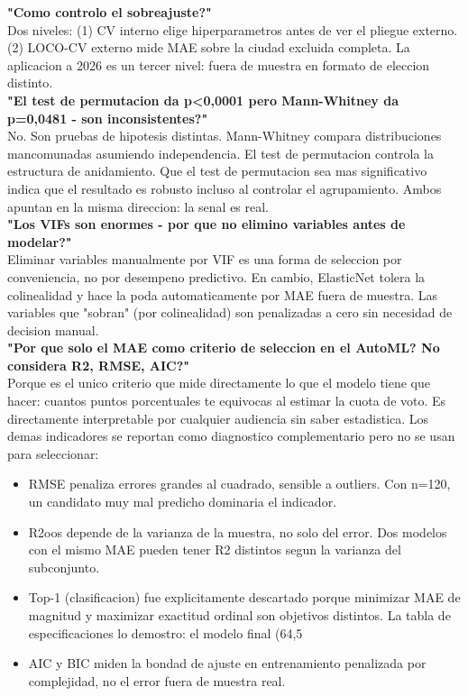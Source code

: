 \documentclass[11pt,a4paper]{article}
\begin{document}
{{{\textbf{"Como controlo el sobreajuste?"}\\[2pt]
Dos niveles: (1) CV interno elige hiperparametros antes de ver el pliegue externo. (2) LOCO-CV externo mide MAE sobre la ciudad excluida completa. La aplicacion a 2026 es un tercer nivel: fuera de muestra en formato de eleccion distinto.\\[2pt]

\textbf{"El test de permutacion da p<0,0001 pero Mann-Whitney da p=0,0481 - son inconsistentes?"}\\[2pt]
No. Son pruebas de hipotesis distintas. Mann-Whitney compara distribuciones mancomunadas asumiendo independencia. El test de permutacion controla la estructura de anidamiento. Que el test de permutacion sea mas significativo indica que el resultado es robusto incluso al controlar el agrupamiento. Ambos apuntan en la misma direccion: la senal es real.\\[2pt]

\textbf{"Los VIFs son enormes - por que no elimino variables antes de modelar?"}\\[2pt]
Eliminar variables manualmente por VIF es una forma de seleccion por conveniencia, no por desempeno predictivo. En cambio, ElasticNet tolera la colinealidad y hace la poda automaticamente por MAE fuera de muestra. Las variables que "sobran" (por colinealidad) son penalizadas a cero sin necesidad de decision manual.\\[2pt]

\textbf{"Por que solo el MAE como criterio de seleccion en el AutoML? No considera R2, RMSE, AIC?"}\\[2pt]
Porque es el unico criterio que mide directamente lo que el modelo tiene que hacer: cuantos puntos porcentuales te equivocas al estimar la cuota de voto. Es directamente interpretable por cualquier audiencia sin saber estadistica. Los demas indicadores se reportan como diagnostico complementario pero no se usan para seleccionar:\\[2pt]

\begin{itemize}[noitemsep,topsep=2pt]
\item RMSE penaliza errores grandes al cuadrado, sensible a outliers. Con n=120, un candidato muy mal predicho dominaria el indicador.
\item R2oos depende de la varianza de la muestra, no solo del error. Dos modelos con el mismo MAE pueden tener R2 distintos segun la varianza del subconjunto.
\item Top-1 (clasificacion) fue explicitamente descartado porque minimizar MAE de magnitud y maximizar exactitud ordinal son objetivos distintos. La tabla de especificaciones lo demostro: el modelo final (64,5%
\item AIC y BIC miden la bondad de ajuste en entrenamiento penalizada por complejidad, no el error fuera de muestra real.
\end{itemize}

}}}
\end{document}
